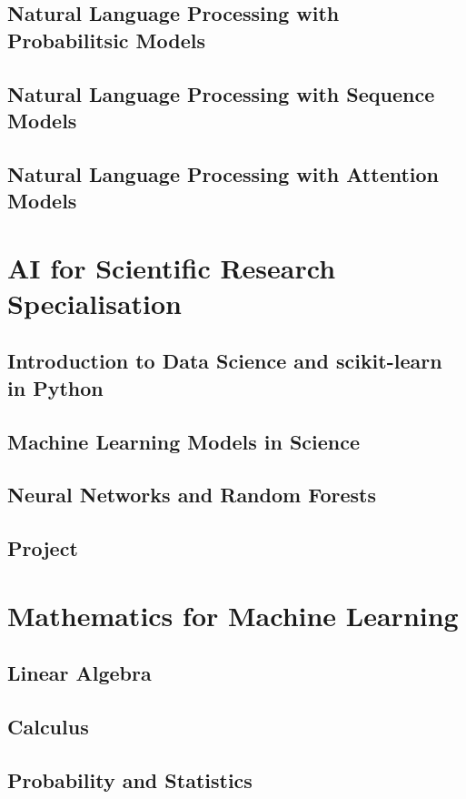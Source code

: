 \documentclass[a4paper, 11pt]{book}
\begin{document}
    \chapter{Natural Language Processing with Probabilitsic Models}
    \chapter{Natural Language Processing with Sequence Models}
    \chapter{Natural Language Processing with Attention Models}
    
    \part{AI for Scientific Research Specialisation}
    \chapter{Introduction to Data Science and scikit-learn in Python}
    \chapter{Machine Learning Models in Science}
    \chapter{Neural Networks and Random Forests}
    \chapter{Project}
    
    \part{Mathematics for Machine Learning}
    \chapter{Linear Algebra}
    \chapter{Calculus}
    \chapter{Probability and Statistics}
        
\end{document}

